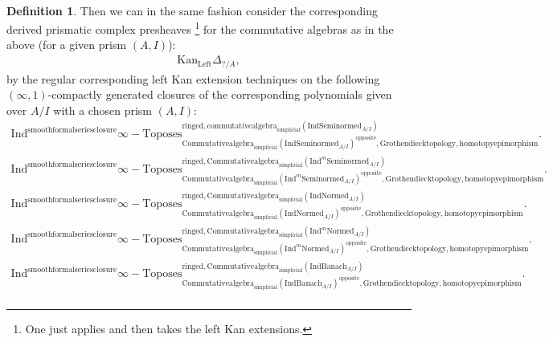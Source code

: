 \documentclass[11pt]{book}
\theoremstyle{definition}
\newtheorem{definition}[theorem]{Definition}
\numberwithin{equation}{section}
\begin{document}
\

\begin{definition}
Then we can in the same fashion consider the corresponding derived prismatic complex presheaves \cite[Construction 7.6]{12BS}\footnote{One just applies \cite[Construction 7.6]{12BS} and then takes the left Kan extensions.} for the commutative algebras as in the above (for a given prism $(A,I)$):
\begin{align}
\mathrm{Kan}_{\mathrm{Left}}\Delta_{?/A},	
\end{align}
by the regular corresponding left Kan extension techniques on the following $(\infty,1)$-compactly generated closures of the corresponding polynomials given over $A/I$ with a chosen prism $(A,I)$:\\

\begin{align}
\mathrm{Ind}^\text{smoothformalseriesclosure}\infty-\mathrm{Toposes}^{\mathrm{ringed},\mathrm{commutativealgebra}_{\mathrm{simplicial}}(\mathrm{Ind}\mathrm{Seminormed}_{A/I})}_{\mathrm{Commutativealgebra}_{\mathrm{simplicial}}(\mathrm{Ind}\mathrm{Seminormed}_{A/I})^\mathrm{opposite},\mathrm{Grothendiecktopology,homotopyepimorphism}}. \\
\mathrm{Ind}^\text{smoothformalseriesclosure}\infty-\mathrm{Toposes}^{\mathrm{ringed},\mathrm{Commutativealgebra}_{\mathrm{simplicial}}(\mathrm{Ind}^m\mathrm{Seminormed}_{A/I})}_{\mathrm{Commutativealgebra}_{\mathrm{simplicial}}(\mathrm{Ind}^m\mathrm{Seminormed}_{A/I})^\mathrm{opposite},\mathrm{Grothendiecktopology,homotopyepimorphism}}.\\
\mathrm{Ind}^\text{smoothformalseriesclosure}\infty-\mathrm{Toposes}^{\mathrm{ringed},\mathrm{Commutativealgebra}_{\mathrm{simplicial}}(\mathrm{Ind}\mathrm{Normed}_{A/I})}_{\mathrm{Commutativealgebra}_{\mathrm{simplicial}}(\mathrm{Ind}\mathrm{Normed}_{A/I})^\mathrm{opposite},\mathrm{Grothendiecktopology,homotopyepimorphism}}.\\
\mathrm{Ind}^\text{smoothformalseriesclosure}\infty-\mathrm{Toposes}^{\mathrm{ringed},\mathrm{Commutativealgebra}_{\mathrm{simplicial}}(\mathrm{Ind}^m\mathrm{Normed}_{A/I})}_{\mathrm{Commutativealgebra}_{\mathrm{simplicial}}(\mathrm{Ind}^m\mathrm{Normed}_{A/I})^\mathrm{opposite},\mathrm{Grothendiecktopology,homotopyepimorphism}}.\\
\mathrm{Ind}^\text{smoothformalseriesclosure}\infty-\mathrm{Toposes}^{\mathrm{ringed},\mathrm{Commutativealgebra}_{\mathrm{simplicial}}(\mathrm{Ind}\mathrm{Banach}_{A/I})}_{\mathrm{Commutativealgebra}_{\mathrm{simplicial}}(\mathrm{Ind}\mathrm{Banach}_{A/I})^\mathrm{opposite},\mathrm{Grothendiecktopology,homotopyepimorphism}}.\\

\end{align}
\end{definition}
\end{document}
